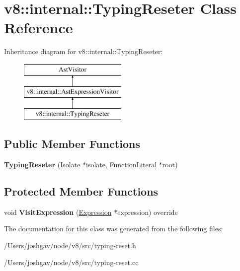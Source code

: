 \hypertarget{classv8_1_1internal_1_1_typing_reseter}{}\section{v8\+:\+:internal\+:\+:Typing\+Reseter Class Reference}
\label{classv8_1_1internal_1_1_typing_reseter}
Inheritance diagram for v8\+:\+:internal\+:\+:Typing\+Reseter\+:\begin{figure}[H]
\begin{center}
\leavevmode
\includegraphics[height=3.000000cm]{classv8_1_1internal_1_1_typing_reseter}
\end{center}
\end{figure}
\subsection*{Public Member Functions}
\begin{DoxyCompactItemize}
\item 
{\bfseries Typing\+Reseter} (\hyperlink{classv8_1_1internal_1_1_isolate}{Isolate} $\ast$isolate, \hyperlink{classv8_1_1internal_1_1_function_literal}{Function\+Literal} $\ast$root)\hypertarget{classv8_1_1internal_1_1_typing_reseter_ab59e509d1b8de15b87ef723d09183117}{}\label{classv8_1_1internal_1_1_typing_reseter_ab59e509d1b8de15b87ef723d09183117}

\end{DoxyCompactItemize}
\subsection*{Protected Member Functions}
\begin{DoxyCompactItemize}
\item 
void {\bfseries Visit\+Expression} (\hyperlink{classv8_1_1internal_1_1_expression}{Expression} $\ast$expression) override\hypertarget{classv8_1_1internal_1_1_typing_reseter_a089663068787df306e0b0d8eb0bffdf5}{}\label{classv8_1_1internal_1_1_typing_reseter_a089663068787df306e0b0d8eb0bffdf5}

\end{DoxyCompactItemize}


The documentation for this class was generated from the following files\+:\begin{DoxyCompactItemize}
\item 
/\+Users/joshgav/node/v8/src/typing-\/reset.\+h\item 
/\+Users/joshgav/node/v8/src/typing-\/reset.\+cc\end{DoxyCompactItemize}
